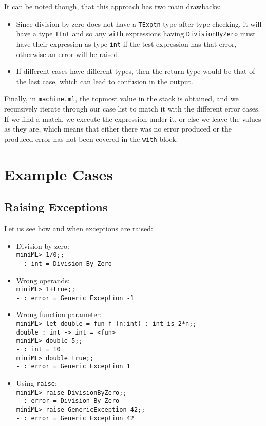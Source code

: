 \documentclass{article}
\begin{document}
        It can be noted though, that this approach has two main drawbacks:
        \begin{itemize}
            \item Since division by zero does not have a \texttt{TExptn} type after type checking, it will have a type \texttt{TInt} and so any \texttt{with} expressions having \texttt{DivisionByZero} must have their expression as type \texttt{int} if the test expression has that error, otherwise an error will be raised.
            \item If different cases have different types, then the return type would be that of the last case, which can lead to confusion in the output.
        \end{itemize}

        Finally, in \texttt{machine.ml}, the topmost value in the stack is obtained, and we recursively iterate through our case list to match it with the different error cases. If we find a match, we execute the expression under it, or else we leave the values as they are, which means that either there was no error produced or the produced error has not been covered in the \texttt{with} block.

    \newpage
\section{Example Cases}
    \subsection{Raising Exceptions}
    Let us see how and when exceptions are raised:
    \begin{itemize}
        \item Division by zero:\\\texttt{miniML> 1/0;;\\- : int = Division By Zero}
        \item Wrong operands:\\\texttt{miniML> 1+true;;\\- : error = Generic Exception -1}
        \item Wrong function parameter:\\\texttt{miniML> let double = fun f (n:int) : int is 2*n;;\\double : int -> int = <fun>\\miniML> double 5;;\\- : int = 10\\miniML> double true;;\\- : error = Generic Exception 1}
        \item Using \texttt{raise}:\\\texttt{miniML> raise DivisionByZero;;\\- : error = Division By Zero\\miniML> raise GenericException 42;;\\- : error = Generic Exception 42}
    \end{itemize}
\end{document}
